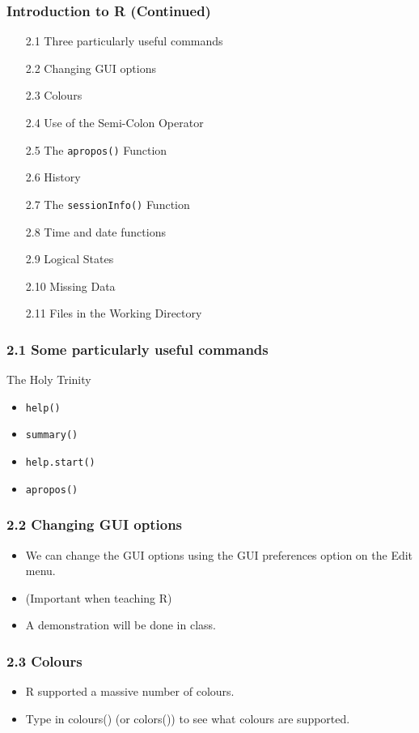 \documentclass{beamer}
\begin{document}
 	\begin{frame}
 		\frametitle{Introduction to R (Continued) }
 		\begin{itemize}
 			\item[2.1] Three particularly useful commands    
 			\item[2.2] Changing GUI options     
 			\item[2.3] Colours      
 			\item[2.4] Use of the Semi-Colon Operator     
 			\item[2.5] The \texttt{apropos()} Function     
 			\item[2.6] History       
 			\item[2.7] The \texttt{sessionInfo()} Function     
 			\item[2.8] Time and date functions     
 			\item[2.9] Logical States      
 			\item[2.10] Missing Data      
 			\item[2.11] Files in the Working Directory     
 		\end{itemize}
 	\end{frame}
 	
 	\begin{frame}
 		\frametitle{2.1 Some particularly useful commands}
 		
 		
 		The Holy Trinity
 		\begin{itemize}
 			\item \texttt{help()}
 			\item \texttt{summary()}
 			\item \texttt{help.start()}
 			\item \texttt{apropos()}
 		\end{itemize}
 		
 	\end{frame}
 	\begin{frame}
 		\frametitle{2.2 Changing GUI options}
 		\begin{itemize}
 			\item We can change the GUI options using the GUI preferences option on the Edit menu.
 			\item  (Important
 			when teaching R) 
 			\item A demonstration will be done in class.
 		\end{itemize}
 		
 	\end{frame}
 	\begin{frame}
 		\frametitle{2.3 Colours}
 		\begin{itemize}
 			\item R supported a massive number of colours.
 			\item Type in colours() (or colors()) to see what colours
 			are supported.
 		\end{itemize}
 	\end{frame}
 	
\end{document}

